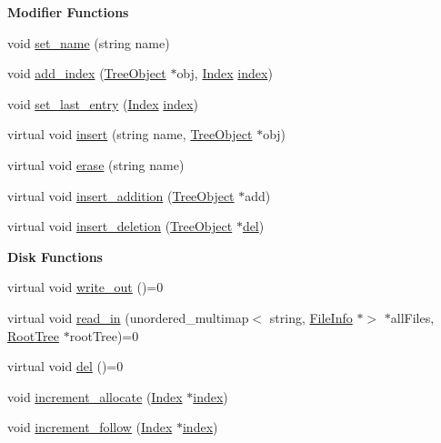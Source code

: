 \begin{Indent}\textbf{ Modifier Functions}\par
\begin{DoxyCompactItemize}
\item 
void \mbox{\hyperlink{classTreeObject_a8ae7e42502b4652102e0b3c4c4e1671b}{set\+\_\+name}} (string name)
\item 
void \mbox{\hyperlink{classTreeObject_af908239ff96a0f3064d0d8aefb58381b}{add\+\_\+index}} (\mbox{\hyperlink{classTreeObject}{Tree\+Object}} $\ast$obj, \mbox{\hyperlink{structindex}{Index}} \mbox{\hyperlink{structindex}{index}})
\item 
void \mbox{\hyperlink{classTreeObject_a2ec94bc9d2647275049ddf2a70b8510e}{set\+\_\+last\+\_\+entry}} (\mbox{\hyperlink{structindex}{Index}} \mbox{\hyperlink{structindex}{index}})
\item 
virtual void \mbox{\hyperlink{classTreeObject_af8cc57edba9f435b52ccf33cfbbb2fc6}{insert}} (string name, \mbox{\hyperlink{classTreeObject}{Tree\+Object}} $\ast$obj)
\item 
virtual void \mbox{\hyperlink{classTreeObject_a453b5df2a9ef7c6faad259900d574ee2}{erase}} (string name)
\item 
virtual void \mbox{\hyperlink{classTreeObject_a41ce6080e0df5adcea4b0a76d35af885}{insert\+\_\+addition}} (\mbox{\hyperlink{classTreeObject}{Tree\+Object}} $\ast$add)
\item 
virtual void \mbox{\hyperlink{classTreeObject_afcc4b3928d2b77ff080aa229a9706215}{insert\+\_\+deletion}} (\mbox{\hyperlink{classTreeObject}{Tree\+Object}} $\ast$\mbox{\hyperlink{classTreeObject_af390b7479aa972888e594c07a85740b6}{del}})
\end{DoxyCompactItemize}
\end{Indent}
\begin{Indent}\textbf{ Disk Functions}\par
\begin{DoxyCompactItemize}
\item 
virtual void \mbox{\hyperlink{classTreeObject_a63708d61353d83e3e03597394bb7aca0}{write\+\_\+out}} ()=0
\item 
virtual void \mbox{\hyperlink{classTreeObject_a722eb00e6782626281afc8eff92840a4}{read\+\_\+in}} (unordered\+\_\+multimap$<$ string, \mbox{\hyperlink{classFileInfo}{File\+Info}} $\ast$$>$ $\ast$all\+Files, \mbox{\hyperlink{classRootTree}{Root\+Tree}} $\ast$root\+Tree)=0
\item 
virtual void \mbox{\hyperlink{classTreeObject_af390b7479aa972888e594c07a85740b6}{del}} ()=0
\item 
void \mbox{\hyperlink{classTreeObject_a6b6f0a5c23577748b489652013fa1728}{increment\+\_\+allocate}} (\mbox{\hyperlink{structindex}{Index}} $\ast$\mbox{\hyperlink{structindex}{index}})
\item 
void \mbox{\hyperlink{classTreeObject_a86fbde9e7ee245385bf7ca7a8f355bd0}{increment\+\_\+follow}} (\mbox{\hyperlink{structindex}{Index}} $\ast$\mbox{\hyperlink{structindex}{index}})
\end{DoxyCompactItemize}
\end{Indent}
